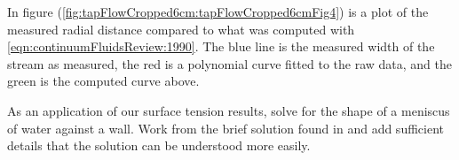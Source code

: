 \begin{Answer}[ref={problem:fluids:review:q2}]
In figure (\ref{fig:tapFlowCropped6cm:tapFlowCropped6cmFig4}) is a plot of the measured radial distance compared to what was computed with \ref{eqn:continuumFluidsReview:1990}.  The blue line is the measured width of the stream as measured, the red is a polynomial curve fitted to the raw data, and the green is the computed curve above.

\end{Answer}

\begin{Exercise}[
title={The meniscus curve against one wall.},
label={problem:fluids:review:q3}
]
As an application of our surface tension results, solve for the shape of a meniscus of water against a wall.  Work from the brief solution found in \cite{landau1987course} and add sufficient details that the solution can be understood more easily.
\end{Exercise}

